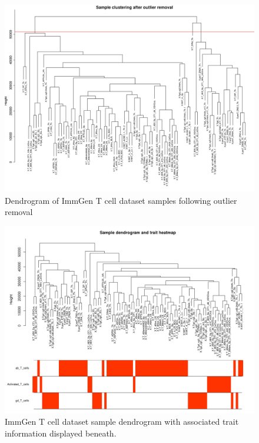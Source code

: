 \begin{figure}[H] 
    \centering
\includegraphics[width=1\textwidth]{Figures/Chapter4/WGCNA/tcell_immgen_data_sampleClustering.png}
\caption{\small{Dendrogram of ImmGen T cell dataset samples following outlier removal} }
    \label{fig:12}
\end{figure}

\begin{figure}[H] 
    \centering
\includegraphics[width=1\textwidth]{Figures/Chapter4/WGCNA/tcell_immgen_data_dendrogram_plus_traits.png}
\caption{\small{ImmGen T cell dataset sample dendrogram with associated trait information displayed beneath.} }
    \label{fig:13}
\end{figure}

